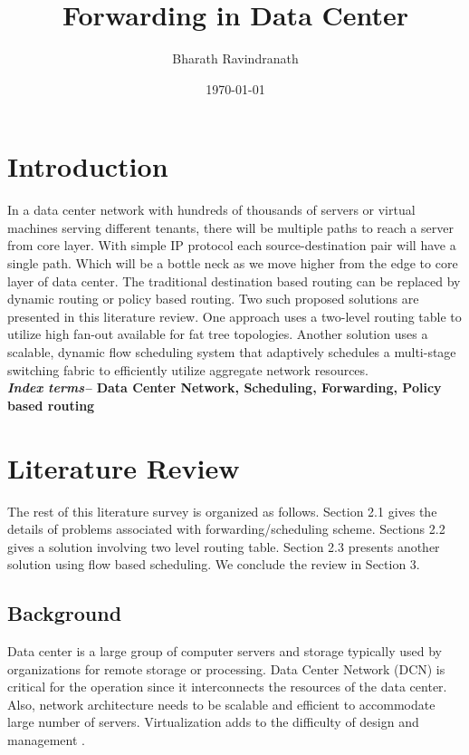 \documentclass[11pt,letterpaper,onecolumn]{article}
\title{Forwarding in Data Center}
\author{Bharath Ravindranath}
\date {\today}
\begin{document}
{\let\newpage\relax\maketitle}

\section{Introduction}
\justify
\par{\qquad In a data center network with hundreds of thousands of servers or virtual machines serving different tenants, there will be multiple paths to reach a server from core layer. With simple IP protocol each source-destination pair will have a single path. Which will be a bottle neck as we move higher from the edge to core layer of data center. The traditional  destination based routing can be replaced by dynamic routing or policy based routing. Two such proposed solutions are presented in this literature review. One approach uses a two-level routing table to utilize high fan-out available for fat tree topologies\cite{al2008scalable}. Another solution uses a scalable, dynamic flow scheduling system that adaptively schedules a multi-stage switching fabric to efficiently utilize aggregate network resources\cite{al2010hedera}.}
\\

\textbf{\textit{Index terms--} Data Center Network, Scheduling, Forwarding, Policy based routing}

\section{Literature Review}
\justify


\par{\qquad The rest of this literature survey is organized as follows. Section 2.1 gives the details of problems associated with forwarding/scheduling scheme. Sections 2.2 gives a solution involving two level routing table. Section 2.3 presents another solution using flow based scheduling. We conclude the review in Section 3.}


\subsection{Background}

\par{\qquad Data center is a large group of computer servers and storage typically used by organizations for remote storage or processing. Data Center Network (DCN) is critical for the operation since it interconnects the resources of the data center. Also, network architecture needs to be scalable and efficient to accommodate large number of servers. Virtualization adds to the difficulty of design and management \cite{wiki:001}.}\\
\end{document}
